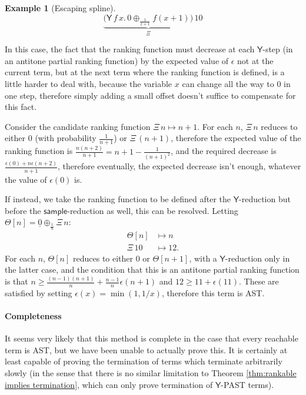 \documentclass{article}
\newcommand{\tY}{\mathsf{Y}}
\newcommand{\tsample}{\mathsf{sample}}
\theoremstyle{definition}
\newtheorem{example}{Example}
\theoremstyle{lemma}
\theoremstyle{remark}
\begin{document}
\begin{example}[Escaping spline]
\label{ex:escaping spline}\citep[\S 5.4]{DBLP:journals/pacmpl/McIverMKK18}
\[
\underbrace{\big
(\tY \, f \, x . \,
0 \oplus_{\frac{1}{x+1}} f(x + 1) \big)}_{\Xi} 
\, 10
\]

In this case, the fact that the ranking function must decrease at each $\tY$-step (in an antitone partial ranking function) by the expected value of $\epsilon$ not at the current term, but at the next term where the ranking function is defined, is a little harder to deal with, because the variable $x$ can change all the way to $0$ in one step, therefore simply adding a small offset doesn't suffice to compensate for this fact.

Consider the candidate ranking function $\Xi \, n \mapsto n + 1$. For each $n$, $\Xi \, n$ reduces to either $0$ (with probability $\frac 1 {n + 1}$) or $\Xi \, (n + 1)$, therefore the expected value of the ranking function is $\frac{n(n+2)}{n+1} = n + 1 - \frac 1 {(n+1)^2}$, and the required decrease is $\frac{\epsilon(0) + n \epsilon(n + 2)}{n + 1}$, therefore eventually, the expected decrease isn't enough, whatever the value of $\epsilon(0)$ is.

If instead, we take the ranking function to be defined after the $\tY$-reduction but before the $\tsample$-reduction as well, this can be resolved. Letting $\Theta[n] = \underline 0 \oplus_{\frac 1 n} \Xi \, n$:
\begin{align*}
\Theta[n] &\mapsto n \\
\Xi \, 10 & \mapsto 12.
\end{align*}
For each $n$, $\Theta[n]$ reduces to either $0$ or $\Theta[n+1]$, with a $\tY$-reduction only in the latter case, and the condition that this is an antitone partial ranking function is that $n \geq \frac{(n-1)(n+1)}{n} + \frac{n-1}{n} \epsilon(n+1)$ and $12 \geq 11 + \epsilon(11)$. These are satisfied by setting $\epsilon(x) = \min(1, 1/x)$, therefore this term is AST.
\end{example}

\paragraph{Completeness}
It seems very likely that this method is complete in the case that every reachable term is AST, but we have been unable to actually prove this. It is certainly at least capable of proving the termination of terms which terminate arbitrarily slowly (in the sense that there is no similar limitation to Theorem \ref{thm:rankable implies termination}, which can only prove termination of $\tY$-PAST terms).
\end{document}
